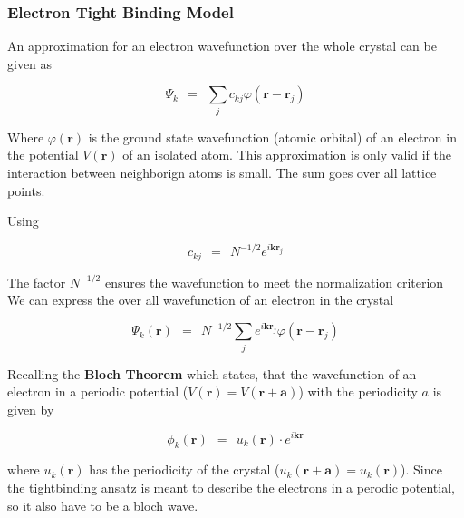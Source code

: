 \documentclass[10pt]{report}
\numberwithin{equation}{chapter}
\begin{document}
\subsubsection{Electron Tight Binding Model}
%



An approximation for an electron wavefunction over the whole crystal can be given as

\begin{equation}
  \Psi_k ~~=~~ \sum_j c_{kj} \varphi(\mathbf{r}-\mathbf{r}_j)
\end{equation}

Where $\varphi(\mathbf{r})$ is the ground state wavefunction (atomic orbital) of an electron in the potential $V(\mathbf{r})$ of an isolated atom. This approximation is only valid if the interaction between neighborign atoms is small. The sum goes over all lattice points.


Using

\begin{equation}
  c_{kj} ~~=~~ N^{-1/2} e^{i \mathbf{k} \mathbf{r}_j}
\end{equation}

The factor $N^{-1/2}$ ensures the wavefunction to meet the normalization criterion
We can express the over all wavefunction of an electron in the crystal

\begin{equation} \label{eq:el_wf}
  \Psi_k(\mathbf{r}) 
  ~~=~~ N^{-1/2} \sum_j e^{i\mathbf{k} \mathbf{r}_j} \varphi(\mathbf{r} - \mathbf{r}_j)
\end{equation}


Recalling the \textbf{Bloch Theorem} which states, that the wavefunction of an electron in a periodic potential ($V(\mathbf{r}) = V(\mathbf{r} + \mathbf{a})$) with the periodicity $a$ is given by

\begin{equation} \label{eq:bloch_theorem}
  \phi_k(\mathbf{r}) ~~=~~ u_k(\mathbf{r}) \cdot e^{i\mathbf{k} \mathbf{r}}
\end{equation}

where $u_k(\mathbf{r})$ has the periodicity of the crystal ($u_k(\mathbf{r} + \mathbf{a}) = u_k(\mathbf{r})$). Since the tightbinding ansatz is meant to describe the electrons in a perodic potential, so it also have to be a bloch wave. 
\end{document}
